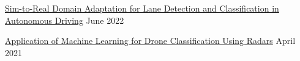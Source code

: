     
\vspace{2pt}

\begin{indentsection}

\href{https://arxiv.org/abs/2202.07133}
{Sim-to-Real Domain Adaptation for Lane Detection and Classification in Autonomous Driving}
\hfill
June 2022

\end{indentsection}

\vspace{2pt}

\begin{indentsection}
\href{https://www.spiedigitallibrary.org/conference-proceedings-of-spie/11756/117560C/Application-of-machine-learning-for-drone-classification-using-radars/10.1117/12.2588694.short?SSO=1}
{Application of Machine Learning for Drone Classification Using Radars}
\hfill
April 2021
\end{indentsection}
